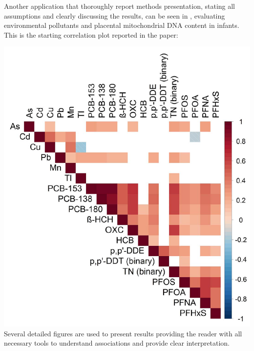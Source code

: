 \documentclass[
]{book}
\begin{document}
Another application that thoroughly report methods presentation, stating all assumptions and clearly discussing the results, can be seen in \citet{vriens2017neonatal}, evaluating environmental pollutants and placental mitochondrial DNA content in infants. This is the starting correlation plot reported in the paper:

\includegraphics{images/corrplot2.png}
Several detailed figures are used to present results providing the reader with all necessary tools to understand associations and provide clear interpretation.
\end{document}
